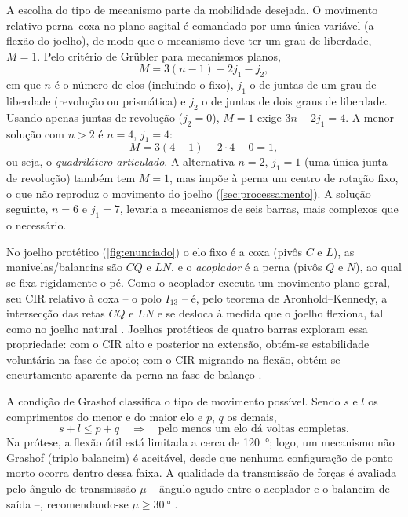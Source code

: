 \documentclass[12pt,a4paper,twoside]{article}
\numberwithin{equation}{section}
\begin{document}
A escolha do tipo de mecanismo parte da mobilidade desejada. O movimento relativo
perna--coxa no plano sagital é comandado por uma única variável (a flexão do joelho), de
modo que o mecanismo deve ter um grau de liberdade, $M = 1$. Pelo critério de Grübler para
mecanismos planos,
\begin{equation}
  M = 3(n-1) - 2j_1 - j_2 ,
\end{equation}
em que $n$ é o número de elos (incluindo o fixo), $j_1$ o de juntas de um grau de liberdade
(revolução ou prismática) e $j_2$ o de juntas de dois graus de liberdade. Usando apenas
juntas de revolução ($j_2 = 0$), $M = 1$ exige $3n - 2j_1 = 4$. A menor solução com $n > 2$ é
$n = 4$, $j_1 = 4$:
\begin{equation}
  M = 3(4-1) - 2\cdot 4 - 0 = 1 ,
\end{equation}
ou seja, o \emph{quadrilátero articulado}. A alternativa $n = 2$, $j_1 = 1$ (uma única junta de
revolução) também tem $M = 1$, mas impõe à perna um centro de rotação fixo, o que não
reproduz o movimento do joelho (\cref{sec:processamento}). A solução seguinte,
$n = 6$ e $j_1 = 7$, levaria a mecanismos de seis barras, mais complexos que o necessário.

No joelho protético (\cref{fig:enunciado}) o elo fixo é a coxa (pivôs $C$ e $L$),
as manivelas/balancins são $CQ$ e $LN$, e o \emph{acoplador} é a perna (pivôs $Q$ e $N$),
ao qual se fixa rigidamente o pé. Como o acoplador executa um movimento plano geral,
seu CIR relativo à coxa -- o polo $I_{13}$ -- é, pelo teorema de Aronhold--Kennedy, a
intersecção das retas $CQ$ e $LN$ e se desloca à medida que o joelho flexiona, tal como
no joelho natural \cite{norton2010,radcliffe1994}. Joelhos protéticos de quatro barras
exploram essa propriedade: com o CIR alto e posterior na extensão, obtém-se
estabilidade voluntária na fase de apoio; com o CIR migrando na flexão, obtém-se
encurtamento aparente da perna na fase de balanço \cite{radcliffe1994}.

A condição de Grashof classifica o tipo de movimento possível. Sendo $s$ e $l$ os
comprimentos do menor e do maior elo e $p$, $q$ os demais,
\begin{equation}
  s + l \le p + q \quad\Longrightarrow\quad \text{pelo menos um elo dá voltas completas.}
  \label{eq:grashof}
\end{equation}
Na prótese, a flexão útil está limitada a cerca de \SI{120}{\degree}; logo, um mecanismo
não Grashof (triplo balancim) é aceitável, desde que nenhuma configuração de ponto
morto ocorra dentro dessa faixa. A qualidade da transmissão de forças é avaliada pelo
ângulo de transmissão $\mu$ -- ângulo agudo entre o acoplador e o balancim de saída --,
recomendando-se $\mu \ge \SI{30}{\degree}$ \cite{norton2010}.
\end{document}
